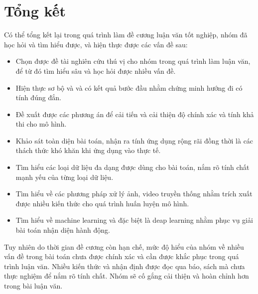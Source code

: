 \section{Tổng kết}

Có thể tổng kết lại trong quá trình làm đề cương luận văn tốt nghiệp, nhóm đã học hỏi và tìm hiểu được, và hiện thực được các vấn đề sau:

\begin{itemize}
    \item Chọn được đề tài nghiên cứu thú vị cho nhóm trong quá trình làm luận văn, để từ đó tìm hiểu sâu và học hỏi được nhiều vấn đề.
    \item Hiện thực sơ bộ và và có kết quả bước đầu nhằm chứng minh hướng đi có tính đúng đắn.
    \item Đề xuất được các phương án để cải tiến và cải thiện độ chính xác và tính khả thi cho mô hình.
    \item Khảo sát toàn diện bài toán, nhận ra tính ứng dụng rộng rãi đồng thời là các thách thức khó khăn khi ứng dụng vào thực tế.
    \item Tìm hiểu các loại dữ liệu đa dạng được dùng cho bài toán, nắm rõ tính chất mạnh yếu của từng loại dữ liệu.
    \item Tìm hiểu về các phương pháp xử lý ảnh, video truyền thống nhằm trích xuất được nhiều kiến thức cho quá trình huấn luyện mô hình.
    \item Tìm hiểu về machine learning và đặc biệt là deap learning nhằm phục vụ giải bài toán nhận diện hành động.
\end{itemize}

Tuy nhiên do thời gian đề cương còn hạn chế, mức độ hiểu của nhóm về nhiều vấn đề trong bài toán chưa được chính xác và cần được khắc phục trong quá trình luận văn. Nhiều kiến thức và nhận định được đọc qua báo, sách mà chưa thực nghiệm để nắm rõ tính chất. Nhóm sẽ cố gắng cải thiện và hoàn chỉnh hơn trong bài luận văn.